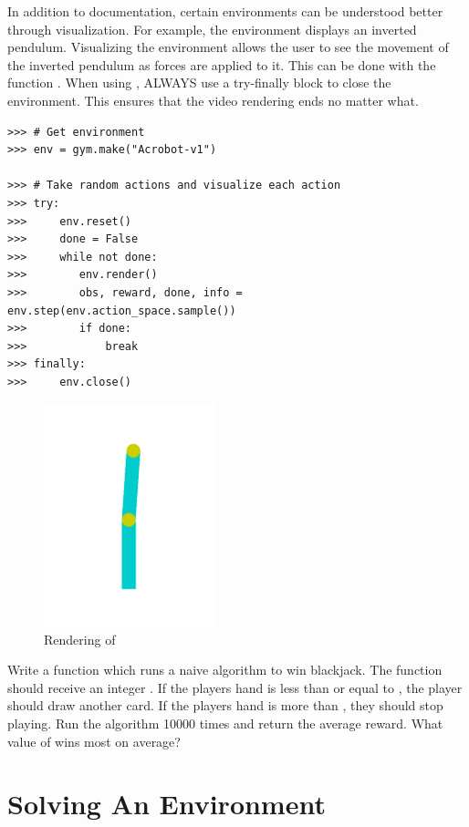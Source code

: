 In addition to documentation, certain environments can be understood better through visualization.
For example, the environment  displays an inverted pendulum.
Visualizing the environment allows the user to see the movement of the inverted pendulum as forces are applied to it.
This can be done with the function .
When using , ALWAYS use a try-finally block to close the environment.
This ensures that the video rendering ends no matter what.

\begin{lstlisting}
>>> # Get environment
>>> env = gym.make("Acrobot-v1")

>>> # Take random actions and visualize each action
>>> try:
>>>     env.reset()
>>>     done = False
>>>     while not done:
>>>        env.render()
>>>        obs, reward, done, info = env.step(env.action_space.sample())
>>>        if done:
>>>            break
>>> finally:
>>>     env.close()
\end{lstlisting}

\begin{figure}[H]
\includegraphics[width=5cm]{figures/acrobot.pdf}
\caption{Rendering of }
\end{figure}

\begin{problem}
Write a function  which runs a naive algorithm to win blackjack.
The function should receive an integer .
If the players hand is less than or equal to , the player should draw another card.
If the players hand is more than , they should stop playing.
Run the algorithm 10000 times and return the average reward.
What value of  wins most on average?
\label{prob:blackjack}
\end{problem}

\section*{Solving An Environment}

